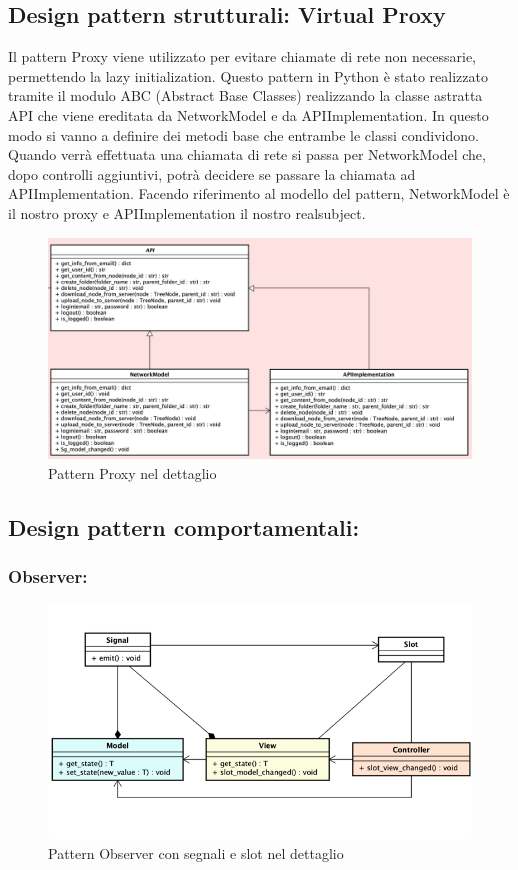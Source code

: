 \subsection{Design pattern strutturali: Virtual Proxy}
Il pattern Proxy viene utilizzato per evitare chiamate di rete non necessarie, permettendo la lazy initialization.\newline{}
Questo pattern in Python è stato realizzato tramite il modulo ABC (Abstract Base Classes) realizzando la classe astratta API che viene ereditata da NetworkModel e da APIImplementation. In questo modo si vanno a definire dei metodi base che entrambe le classi condividono. Quando verrà effettuata una chiamata di rete si passa per NetworkModel che, dopo controlli aggiuntivi, potrà decidere se passare la chiamata ad APIImplementation. Facendo riferimento al modello del pattern, NetworkModel è il nostro proxy e APIImplementation il nostro realsubject.
\begin{figure}[H]
    \centering
    \includegraphics[scale = 0.45]{components/img/proxy-model.png}
    \caption{Pattern Proxy nel dettaglio}
    \label{fig:Pattern proxy nel dettaglio}
\end{figure}
\subsection{Design pattern comportamentali:}
\subsubsection{Observer:}
\begin{figure}[H]
    \centering
    \includegraphics[scale = 1]{components/img/observer-implementazione.png}
    \caption{Pattern Observer con segnali e slot nel dettaglio}
    \label{fig:Pattern observer con segnali e slot}
\end{figure}

